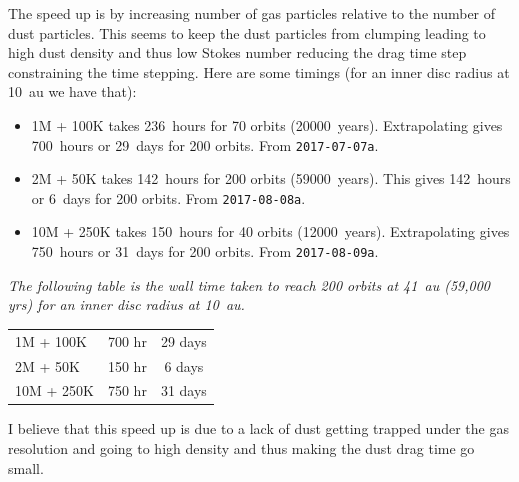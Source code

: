 \documentclass[usenatbib,a4paper,times,fleqn]{mnras}
\begin{document}
The speed up is by increasing number of gas particles relative to the number of
dust particles. This seems to keep the dust particles from clumping leading to
high dust density and thus low Stokes number reducing the drag time step
constraining the time stepping. Here are some timings (for an inner disc radius
at 10~au we have that):
\begin{itemize}
   \item 1M + 100K takes 236~hours for 70 orbits (20000~years). Extrapolating
      gives 700~hours or 29~days for 200 orbits. From \texttt{2017-07-07a}.\\
   \item 2M + 50K takes 142~hours for 200 orbits (59000~years). This gives
      142~hours or 6~days for 200 orbits. From \texttt{2017-08-08a}.\\
   \item 10M + 250K takes 150~hours for 40 orbits (12000~years). Extrapolating
      gives 750~hours or 31~days for 200 orbits. From \texttt{2017-08-09a}.
\end{itemize}

\noindent\textit{The following table is the wall time taken to reach 200 orbits
at 41~au (59,000 yrs) for an inner disc radius at 10~au.}
\begin{center}
   \begin{tabular}{ l c c }
      \hline
      1M + 100K  & 700 hr & 29 days \\
      2M + 50K   & 150 hr & 6 days \\
      10M + 250K & 750 hr & 31 days
      \hline
   \end{tabular}
\end{center}

I believe that this speed up is due to a lack of dust getting trapped under the
gas resolution and going to high density and thus making the dust drag time go
small.
\end{document}
